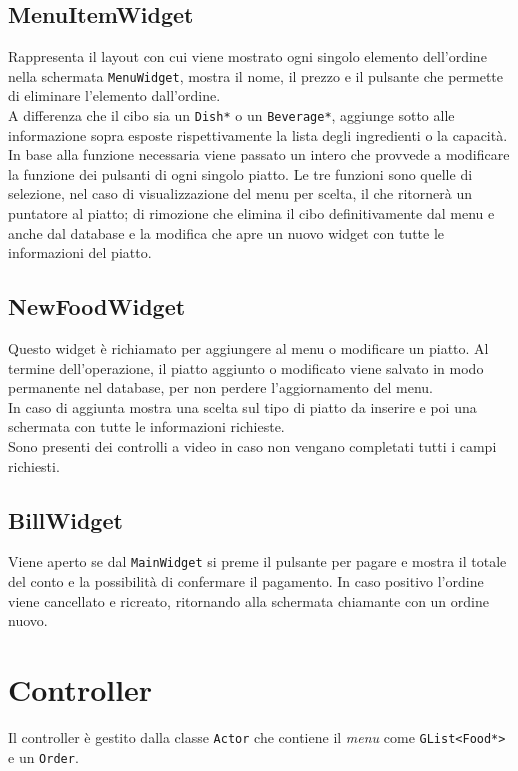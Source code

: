 \documentclass[]{report}   %
\begin{document}
\subsection{MenuItemWidget}
Rappresenta il layout con cui viene mostrato ogni singolo elemento dell'ordine nella schermata \texttt{MenuWidget}, mostra il nome, il prezzo e il pulsante che permette di eliminare l'elemento dall'ordine.\\
A differenza che il cibo sia un \texttt{Dish*} o un \texttt{Beverage*}, aggiunge sotto alle informazione sopra esposte rispettivamente la lista degli ingredienti o la capacità.\\
In base alla funzione necessaria viene passato un intero che provvede a modificare la funzione dei pulsanti di ogni singolo piatto. Le tre funzioni sono quelle di selezione, nel caso di visualizzazione del menu per scelta, il che ritornerà un puntatore al piatto; di rimozione che elimina il cibo definitivamente dal menu e anche dal database e la modifica che apre un nuovo widget con tutte le informazioni del piatto.
\subsection{NewFoodWidget}
Questo widget è richiamato per aggiungere al menu o modificare un piatto. Al termine dell'operazione, il piatto aggiunto o modificato viene salvato in modo permanente nel database, per non perdere l'aggiornamento del menu.\\
In caso di aggiunta mostra una scelta sul tipo di piatto da inserire e poi una schermata con tutte le informazioni richieste.\\
Sono presenti dei controlli a video in caso non vengano completati tutti i campi richiesti.
\subsection{BillWidget}
Viene aperto se dal \texttt{MainWidget} si preme il pulsante per pagare e mostra il totale del conto e la possibilità di confermare il pagamento. In caso positivo l'ordine viene cancellato e ricreato, ritornando alla schermata chiamante con un ordine nuovo.

\section{Controller}     				%
Il controller è gestito dalla classe \texttt{Actor} che contiene il \textit{menu} come \texttt{GList<Food*>} e un \texttt{Order}.
\end{document}
